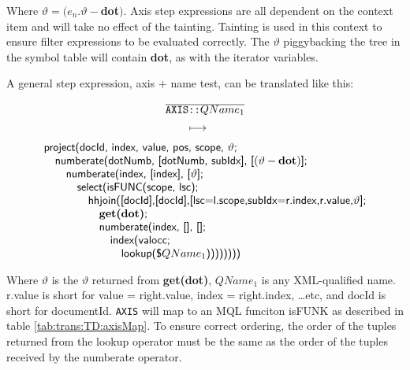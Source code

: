 Where $\vartheta = (e_n.\vartheta-$\textbf{dot}$)$. Axis step expressions are all dependent on the context item and
will take no effect of the tainting. Tainting is used in this context to ensure filter expressions to be evaluated
correctly. The $\vartheta$ piggybacking the tree in the symbol table will contain \textbf{dot}, as with
the iterator variables.

A general step expression, axis + name test, can be translated like this:
\begin{equation}
\begin{array}{c}
\frac{}{\displaystyle \texttt{AXIS::}QName_1} \\ 
\longmapsto \begin{array}{c}\mbox{\tiny } \\ \mbox{\tiny } \end{array} \\
\begin{array}{l}
\mbox{\textsf{project(docId, index, value, pos, scope, }}\vartheta\mbox{\textsf{;}} \\ \quad
\mbox{\textsf{numberate(dotNumb, [dotNumb, subIdx], [}}(\vartheta-\mbox{\textbf{dot}})\mbox{\textsf{];}} \\
\quad\quad 
\mbox{\textsf{numberate(index, [index], [}}\vartheta\mbox{\textsf{];}} \\ \quad\quad\quad
\mbox{\textsf{select(isFUNC(scope, lsc);}} \\ \quad \quad\quad\quad
\mbox{\textsf{hhjoin([docId],[docId],}}
\mbox{\textsf{[lsc=l.scope,subIdx=r.index,r.value,}}\vartheta\mbox{\textsf{];}}\\
\quad\quad\quad\quad\quad \mbox{\textbf{get(dot)}\textsf{;}} \\ \quad \quad\quad \quad\quad
\mbox{\textsf{numberate(index, [], [];}}\\ \quad\quad\quad\quad\quad\quad
\mbox{\textsf{index(valocc;}} \\ \quad\quad\quad\quad\quad\quad\quad
\mbox{\textsf{lookup(\$}}QName_1\mbox{\textsf{))))))))}}
\end{array}
\end{array}
\label{rule:trans:TD:pathStep}
\end{equation}

Where $\vartheta$ is the $\vartheta$ returned from \textbf{get(dot)}, $QName_1$ is any XML-qualified name.
\textsf{r.value} is short for \textsf{value = right.value, index = right.index, \ldots etc}, and \textsf{docId} is
short for \textsf{documentId}. \texttt{AXIS} will map to an MQL funciton \textsf{isFUNK} as described in table
\ref{tab:trans:TD:axisMap}. To ensure correct ordering, the order of the tuples returned from the \textsf{lookup}
operator must be the same as the order of the tuples received by the \textsf{numberate} operator. 


